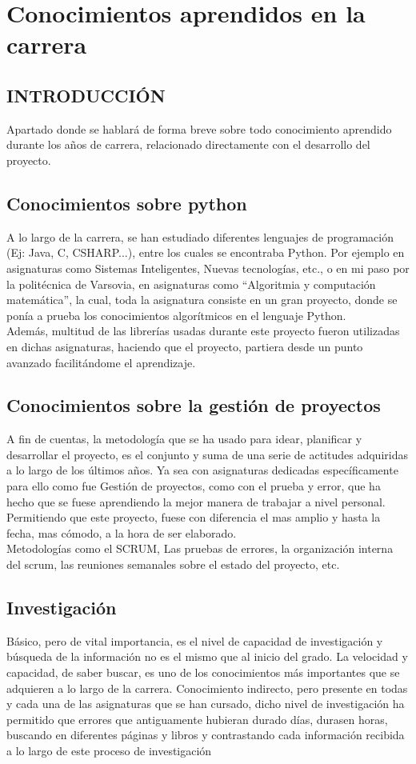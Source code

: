 \section{Conocimientos aprendidos en la carrera}
\subsection{INTRODUCCIÓN}
Apartado donde se hablará de forma breve sobre todo conocimiento aprendido durante los años de carrera, relacionado directamente con el desarrollo del proyecto.
\subsection{Conocimientos sobre python}
A lo largo de la carrera, se han estudiado diferentes lenguajes de programación (Ej: Java, C, CSHARP...), entre los cuales se encontraba Python. Por ejemplo en asignaturas como Sistemas Inteligentes, Nuevas tecnologías, etc., o en mi paso por la politécnica de Varsovia, en asignaturas como “Algoritmia y computación matemática”, la cual, toda la asignatura consiste en un gran proyecto, donde se ponía a prueba los conocimientos algorítmicos en el lenguaje Python.\\
Además, multitud de las librerías usadas durante este proyecto fueron utilizadas en dichas asignaturas, haciendo que el proyecto, partiera desde un punto avanzado facilitándome el aprendizaje.
\subsection{Conocimientos sobre la gestión de proyectos}
A fin de cuentas, la metodología que se ha usado para idear, planificar y desarrollar el proyecto, es el conjunto y suma de una serie de actitudes adquiridas a lo largo de los últimos años. Ya sea con asignaturas dedicadas específicamente para ello como fue Gestión de proyectos, como con el prueba y error, que ha hecho que se fuese aprendiendo la mejor manera de trabajar a nivel personal. Permitiendo que este proyecto, fuese con diferencia el mas amplio y hasta la fecha, mas cómodo, a la hora de ser elaborado.\\
Metodologías como el SCRUM, Las pruebas de errores, la organización interna del scrum, las reuniones semanales sobre el estado del proyecto, etc.
\subsection{Investigación}
Básico, pero de vital importancia, es el nivel de capacidad de investigación y búsqueda de la información no es el mismo que al inicio del grado. La velocidad y capacidad, de saber buscar, es uno de los conocimientos más importantes que se adquieren a lo largo de la carrera. Conocimiento indirecto, pero presente en todas y cada una de las asignaturas que se han cursado, dicho nivel de investigación ha permitido que errores que antiguamente hubieran durado días, durasen horas, buscando en diferentes páginas y libros y contrastando cada información recibida a lo largo de este proceso de investigación
